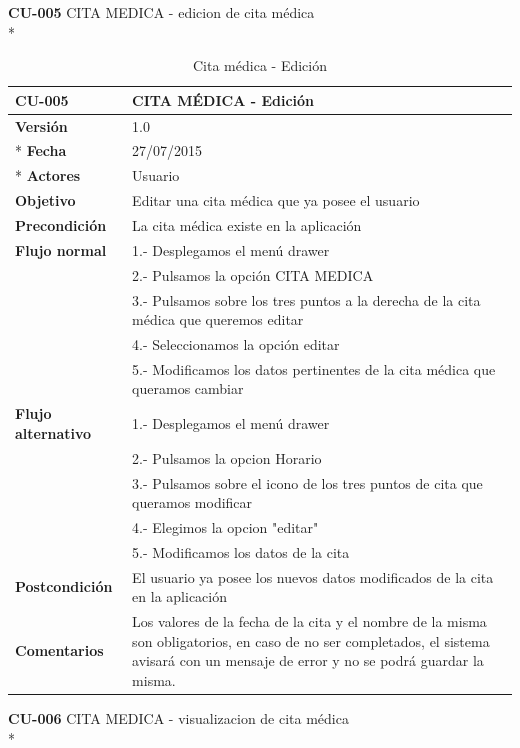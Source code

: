 \documentclass[../pfc.tex]{subfiles}
\begin{document}
	\textbf{CU-005}	CITA MEDICA - edicion de cita médica\\*
	
		\begin{table}[!hbt]
			\centering
			\begin{tabular}[t]{|p{3cm}|p{9.5cm}|}
				\hline \textbf{CU-005} & \textbf{CITA MÉDICA - Edición} \\*
				\hline\hline \textbf{Versión} & 1.0 \\ *
				\hline\hline \textbf{Fecha} & 27/07/2015 \\ *
				\hline\textbf{Actores} 	& Usuario\\*
				\hline \textbf{Objetivo} & Editar una cita médica que ya posee el usuario\\* 			
				\hline \textbf{Precondición} & La cita médica existe en la aplicación\\* 
				\hline \textbf{Flujo normal} & 1.- Desplegamos el menú drawer \\* 
				& 2.- Pulsamos la opción CITA MEDICA\\*	
				& 3.- Pulsamos sobre los tres puntos a la derecha de la cita médica que queremos editar\\*	
				& 4.- Seleccionamos la opción editar\\*	
				& 5.- Modificamos los datos pertinentes de la cita médica que queramos cambiar\\*	
				\hline \textbf{Flujo alternativo} & 1.- Desplegamos el menú drawer \\* 
				& 2.- Pulsamos la opcion Horario \\*	
				& 3.- Pulsamos sobre el icono de los tres puntos de cita que queramos modificar \\*	
				& 4.- Elegimos la opcion "editar"\\*	
				& 5.- Modificamos los datos de la cita\\*	
				\hline \textbf{Postcondición} & El usuario ya posee los nuevos datos modificados de la cita en la aplicación \\* 
				\hline \textbf{Comentarios}   & Los valores de la fecha de la cita y el nombre de la misma son obligatorios, en caso de no ser completados, el sistema avisará con un mensaje de error y no se podrá guardar la misma.\\*
				\hline
			\end{tabular}
			\caption{Cita médica - Edición}
			\label{tabla:caso005}
		\end{table}
		
	
	\textbf{CU-006}	CITA MEDICA - visualizacion de cita médica\\*
	
\end{document}

